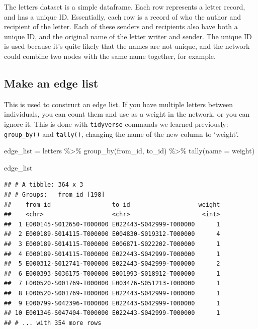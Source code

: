 \documentclass[
]{book}
\newenvironment{Shaded}{\begin{snugshade}}{\end{snugshade}}
\newcommand{\AttributeTok}[1]{\textcolor[rgb]{0.77,0.63,0.00}{#1}}
\newcommand{\FunctionTok}[1]{\textcolor[rgb]{0.00,0.00,0.00}{#1}}
\newcommand{\NormalTok}[1]{#1}
\newcommand{\OtherTok}[1]{\textcolor[rgb]{0.56,0.35,0.01}{#1}}
\newcommand{\SpecialCharTok}[1]{\textcolor[rgb]{0.00,0.00,0.00}{#1}}
\newcommand{\StringTok}[1]{\textcolor[rgb]{0.31,0.60,0.02}{#1}}
\begin{document}
The letters dataset is a simple dataframe. Each row represents a letter record, and has a unique ID. Essentially, each row is a record of who the author and recipient of the letter. Each of these senders and recipients also have both a unique ID, and the original name of the letter writer and sender. The unique ID is used because it's quite likely that the names are not unique, and the network could combine two nodes with the same name together, for example.

\hypertarget{make-an-edge-list}{%
\subsection{Make an edge list}\label{make-an-edge-list}}

This is used to construct an edge list. If you have multiple letters between individuals, you can count them and use as a weight in the network, or you can ignore it. This is done with \texttt{tidyverse} commands we learned previously: \texttt{group\_by()} and \texttt{tally()}, changing the name of the new column to `weight'.

\begin{Shaded}
\begin{Highlighting}[]
\NormalTok{edge\_list }\OtherTok{=}\NormalTok{ letters }\SpecialCharTok{\%\textgreater{}\%} 
  \FunctionTok{group\_by}\NormalTok{(from\_id, to\_id) }\SpecialCharTok{\%\textgreater{}\%} 
  \FunctionTok{tally}\NormalTok{(}\AttributeTok{name =} \StringTok{\textquotesingle{}weight\textquotesingle{}}\NormalTok{)}

\NormalTok{edge\_list}
\end{Highlighting}
\end{Shaded}

\begin{verbatim}
## # A tibble: 364 x 3
## # Groups:   from_id [198]
##    from_id                 to_id                   weight
##    <chr>                   <chr>                    <int>
##  1 E000145-S012650-T000000 E022443-S042999-T000000      1
##  2 E000189-S014115-T000000 E004830-S019312-T000000      4
##  3 E000189-S014115-T000000 E006871-S022202-T000000      1
##  4 E000189-S014115-T000000 E022443-S042999-T000000      1
##  5 E000312-S012741-T000000 E022443-S042999-T000000      2
##  6 E000393-S036175-T000000 E001993-S018912-T000000      1
##  7 E000520-S001769-T000000 E003476-S051213-T000000      1
##  8 E000520-S001769-T000000 E022443-S042999-T000000      1
##  9 E000799-S042396-T000000 E022443-S042999-T000000      1
## 10 E001346-S047404-T000000 E022443-S042999-T000000      1
## # ... with 354 more rows
\end{verbatim}
\end{document}
